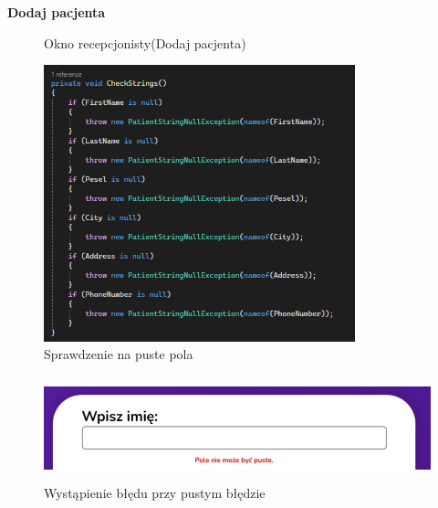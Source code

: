 \Large\textbf{{Dodaj pacjenta}}

\begin{figure}[H]
\centering
    \caption{Okno recepcjonisty(Dodaj pacjenta)}
\end{figure}

\begin{figure}[H]
    \begin{center}
    \includegraphics[height=8cm]{images/spraw_null.png}
    \caption{Sprawdzenie na puste pola}
\end{center}
\end{figure}

\begin{figure}[H]
\begin{center}
    \includegraphics[height=3cm]{images/blad_wpisz_im.png}
    \caption{Wystąpienie błędu przy pustym błędzie}
\end{center}
\end{figure}


